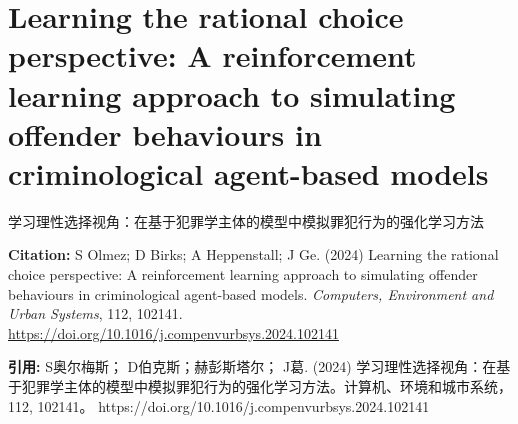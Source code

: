 \vspace{0.5em}
\chapter{Learning the rational choice perspective: A reinforcement learning approach to simulating offender behaviours in criminological agent-based models}
\begin{center}\small 学习理性选择视角：在基于犯罪学主体的模型中模拟罪犯行为的强化学习方法\end{center}

\noindent\textbf{Citation:} S Olmez; D Birks; A Heppenstall; J Ge. (2024) Learning the rational choice perspective: A reinforcement learning approach to simulating offender behaviours in criminological agent-based models. \textit{Computers, Environment and Urban Systems}, 112, 102141. \url{https://doi.org/10.1016/j.compenvurbsys.2024.102141}

\vspace{0.5em}
\noindent\textbf{引用:} S奥尔梅斯； D伯克斯；赫彭斯塔尔； J葛. (2024) 学习理性选择视角：在基于犯罪学主体的模型中模拟罪犯行为的强化学习方法。计算机、环境和城市系统，112, 102141。 https://doi.org/10.1016/j.compenvurbsys.2024.102141

